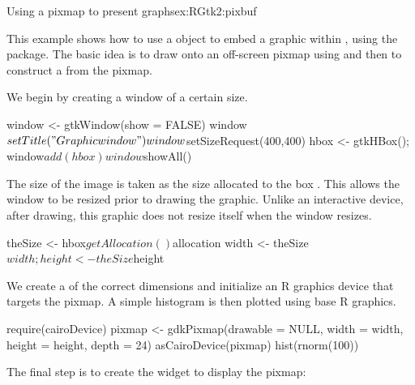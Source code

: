 \begin{example}{Using a pixmap to present graphs}{ex:RGtk2:pixbuf}

  This example shows how to use a  object to
  embed a graphic within , using the
   package. The basic idea is to draw onto an
  off-screen pixmap using  and
  then to construct a  from the pixmap. 

  We begin by creating a window of a certain size.
\begin{Schunk}
\begin{Sinput}
 window <- gtkWindow(show = FALSE)
 window$setTitle("Graphic window")
 window$setSizeRequest(400,400)
 hbox <- gtkHBox(); window$add(hbox)
 window$showAll()
\end{Sinput}
\end{Schunk}


The size of the image is taken as the size allocated to the box
. This allows the window to be resized prior to drawing the
graphic. Unlike an interactive device, after drawing, this graphic
does not resize itself when the window resizes.
\begin{Schunk}
\begin{Sinput}
 theSize <- hbox$getAllocation()$allocation
 width <- theSize$width; height <- theSize$height
\end{Sinput}
\end{Schunk}

We create a  of the correct dimensions and
initialize an R graphics device that targets the pixmap. A simple
histogram is then plotted using base R graphics.
\begin{Schunk}
\begin{Sinput}
 require(cairoDevice)
 pixmap <- gdkPixmap(drawable = NULL, 
                     width = width, height = height, depth = 24)
 asCairoDevice(pixmap)
 hist(rnorm(100))
\end{Sinput}
\end{Schunk}

The final step is to create the  widget to display the
pixmap: 
\begin{Schunk}
\end{Schunk}

\end{example}


